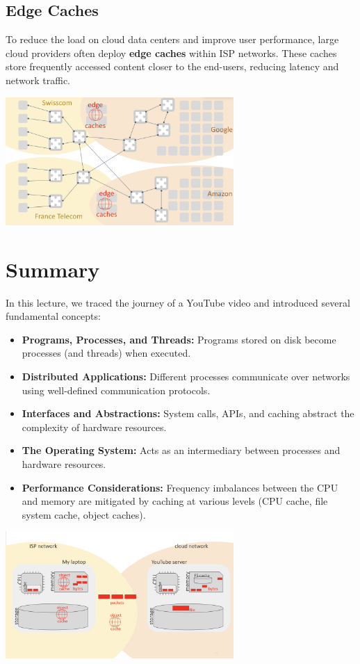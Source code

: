 \documentclass[../../compsys.tex]{subfiles}
\begin{document}
\subsection{Edge Caches}
To reduce the load on cloud data centers and improve user performance, large cloud providers often deploy \textbf{edge caches} within ISP networks. These caches store frequently accessed content closer to the end-users, reducing latency and network traffic.
\begin{center}
  \includegraphics[width=0.65\textwidth]{chapters/L1/images/edge_caches.png}
\end{center}
\section{Summary}
In this lecture, we traced the journey of a YouTube video and introduced several fundamental concepts:
\begin{itemize}
  \item \textbf{Programs, Processes, and Threads:} Programs stored on disk become processes (and threads) when executed.
  \item \textbf{Distributed Applications:} Different processes communicate over networks using well-defined communication protocols.
  \item \textbf{Interfaces and Abstractions:} System calls, APIs, and caching abstract the complexity of hardware resources.
  \item \textbf{The Operating System:} Acts as an intermediary between processes and hardware resources.
  \item \textbf{Performance Considerations:} Frequency imbalances between the CPU and memory are mitigated by caching at various levels (CPU cache, file system cache, object caches).
\end{itemize}

\begin{center}
  \includegraphics[width=0.65\textwidth]{chapters/L1/images/conclusion_youtube.png}
\end{center}
\end{document}
